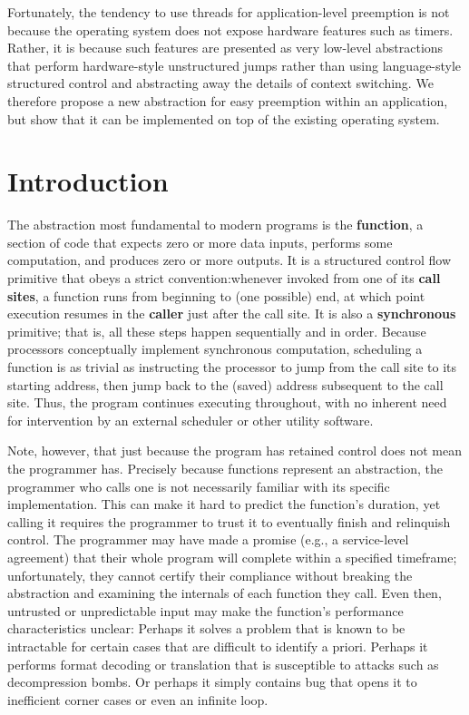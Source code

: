 \documentclass[12pt,letterpaper,openright]{report}
\begin{document}
Fortunately, the tendency to use threads for application-level preemption is not
because the operating system does not expose hardware features such as timers.
Rather, it is because such features are presented as very low-level abstractions that
perform hardware-style unstructured jumps rather than using language-style structured
control and abstracting away the details of context switching.  We therefore propose
a new abstraction for easy preemption within an application, but show that it can be
implemented on top of the existing operating system.
\fi


\chapter{Introduction}

The abstraction most fundamental to modern programs is the \textbf{function}, a
section of code that expects zero or more data inputs, performs some computation, and
produces zero or more outputs.  It is a structured control flow primitive that obeys
a strict convention:\@ whenever invoked from one of its \textbf{call sites}, a
function runs from beginning to (one possible) end, at which point execution resumes
in the \textbf{caller} just after the call site.  It is also a \textbf{synchronous}
primitive; that is, all these steps happen sequentially and in order.  Because
processors conceptually implement synchronous computation, scheduling a function is
as trivial as instructing the processor to jump from the call site to its starting
address, then jump back to the (saved) address subsequent to the call site.  Thus,
the program continues executing throughout, with no inherent need for intervention by
an external scheduler or other utility software.

Note, however, that just because the program has retained control does not mean the
programmer has.  Precisely because functions represent an abstraction, the programmer
who calls one is not necessarily familiar with its specific implementation.  This can
make it hard to predict the function's duration, yet calling it requires the
programmer to trust it to eventually finish and relinquish control.  The programmer
may have made a promise (e.g., a service-level agreement) that their whole program
will complete within a specified timeframe; unfortunately, they cannot certify their
compliance without breaking the abstraction and examining the internals of each
function they call.  Even then, untrusted or unpredictable input may make the
function's performance characteristics unclear:  Perhaps it solves a problem that is
known to be intractable for certain cases that are difficult to identify a priori.
Perhaps it performs format decoding or translation that is susceptible to attacks
such as decompression bombs.  Or perhaps it simply contains bug that opens it to
inefficient corner cases or even an infinite loop.
\end{document}
